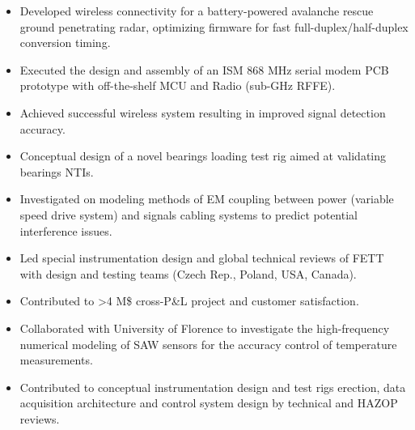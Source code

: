 \documentclass[9pt,a4paper,ragged2e,withhyper]{altacv} %
\begin{document}
\begin{paracol}{2}
\begin{itemize}
\item Developed wireless connectivity for a battery-powered avalanche rescue ground penetrating radar, optimizing firmware for fast full-duplex/half-duplex conversion timing.
\item Executed the design and assembly of an ISM 868 MHz serial modem PCB prototype with off-the-shelf MCU and Radio (sub-GHz RFFE).
\item Achieved successful wireless system resulting in improved signal detection accuracy.
\end{itemize}


\begin{itemize}
  \item Conceptual design of a novel bearings loading test rig aimed at validating bearings NTIs. 
  \item Investigated on modeling methods of EM coupling between power (variable speed drive system) 
  and signals cabling systems to predict potential interference issues.
\end{itemize}
\divider

\begin{itemize}
  \item Led special instrumentation design and global technical reviews of FETT with design
and testing teams (Czech Rep., Poland, USA, Canada).
  \item Contributed to >4 M\$ cross-P\&L project and customer satisfaction.
\end{itemize}
\divider

\begin{itemize}
\item Collaborated with University of Florence to investigate the high-frequency numerical modeling of SAW sensors for the accuracy control of temperature measurements.
\end{itemize}
\divider

\begin{itemize}
\item Contributed to conceptual instrumentation design and test rigs erection, data
acquisition architecture and control system design by technical and HAZOP reviews.
\end{itemize}
\divider


\end{paracol}
\end{document}
